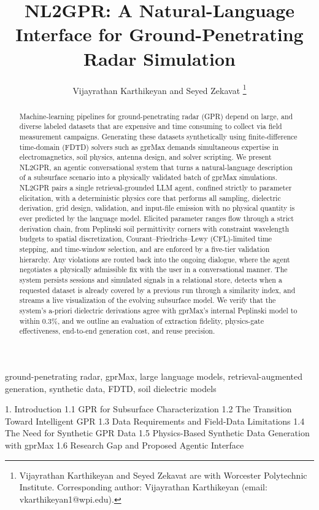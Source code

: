 \documentclass[journal]{IEEEtran}
\title{NL2GPR: A Natural-Language Interface for Ground-Penetrating Radar Simulation}
\author{Vijayrathan Karthikeyan and Seyed Zekavat%
\thanks{Vijayrathan Karthikeyan and Seyed Zekavat are with Worcester Polytechnic Institute. Corresponding author: Vijayrathan Karthikeyan (email: vkarthikeyan1@wpi.edu).}}
\begin{document}
\maketitle


\begin{abstract}
Machine-learning pipelines for ground-penetrating radar (GPR) depend on large, and diverse labeled datasets that are expensive and time consuming to collect via field measurement campaigns. Generating these datasets synthetically using finite-difference time-domain (FDTD) solvers such as gprMax demands simultaneous expertise in electromagnetics, soil physics, antenna design, and solver scripting. We present NL2GPR, an agentic conversational system that turns a natural-language description of a subsurface scenario into a physically validated batch of gprMax simulations. NL2GPR pairs a single retrieval-grounded LLM agent, confined strictly to parameter elicitation, with a deterministic physics core that performs all sampling, dielectric derivation, grid design, validation, and input-file emission with no physical quantity is ever predicted by the language model. Elicited parameter ranges flow through a strict derivation chain, from Peplinski soil permittivity corners with constraint wavelength budgets to spatial discretization, Courant–Friedrichs–Lewy (CFL)-limited time stepping, and time-window selection, and are enforced by a five-tier validation hierarchy. Any violations are routed back into the ongoing dialogue, where the agent negotiates a physically admissible fix with the user in a conversational manner. The system persists sessions and simulated signals in a relational store, detects when a requested dataset is already covered by a previous run through a similarity index, and streams a live visualization of the evolving subsurface model. We verify that the system's a-priori dielectric derivations agree with gprMax's internal Peplinski model to within 0.3\%, and we outline an evaluation of extraction fidelity, physics-gate effectiveness, end-to-end generation cost, and reuse precision.
\end{abstract}

\begin{IEEEkeywords}
ground-penetrating radar, gprMax, large language models, retrieval-augmented generation, synthetic data, FDTD, soil dielectric models
\end{IEEEkeywords}


1. Introduction
   1.1 GPR for Subsurface Characterization
   1.2 The Transition Toward Intelligent GPR
   1.3 Data Requirements and Field-Data Limitations
   1.4 The Need for Synthetic GPR Data
   1.5 Physics-Based Synthetic Data Generation with gprMax
   1.6 Research Gap and Proposed Agentic Interface
\end{document}
